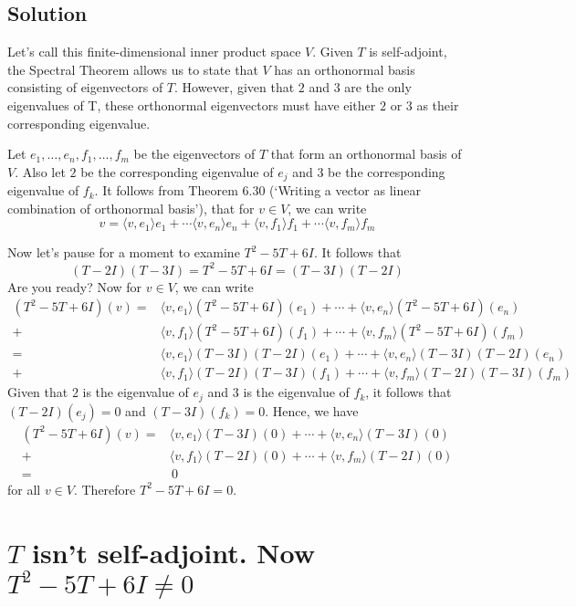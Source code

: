 \documentclass{article}
\begin{document}
\subsection*{Solution}
Let's call this finite-dimensional inner product space $V$. Given $T$ is self-adjoint, the Spectral Theorem allows us to state that $V$ has an orthonormal basis consisting of eigenvectors of $T$. However, given that $2$ and $3$ are the only eigenvalues of T, these orthonormal eigenvectors must have either $2$ or $3$ as their corresponding eigenvalue.

Let $e_1,\ldots,e_n,f_1,\ldots,f_m$ be the eigenvectors of $T$ that form an orthonormal basis of $V$. Also let $2$ be the corresponding eigenvalue of $e_j$ and $3$ be the corresponding eigenvalue of $f_k$. It follows from Theorem 6.30 (`Writing a vector as linear combination of orthonormal basis'), that for $v\in V$, we can write
\[v=\langle v,e_1\rangle e_1 + \cdots \langle v,e_n\rangle e_n + \langle v,f_1\rangle f_1 + \cdots \langle v,f_m\rangle f_m \]

Now let's pause for a moment to examine $T^2-5T+6I$. It follows that 
\[(T-2I)(T-3I)=T^2-5T+6I=(T-3I)(T-2I)\]
Are you ready? Now for $v\in V$, we can write
\begin{align*}
    (T^2-5T+6I)(v) = &\langle v,e_1\rangle(T^2-5T+6I) (e_1) + \cdots + \langle v,e_n\rangle (T^2-5T+6I)(e_n)\\
    + &\langle v,f_1\rangle(T^2-5T+6I) (f_1) + \cdots + \langle v,f_m\rangle(T^2-5T+6I) (f_m) \\
    = &\langle v,e_1\rangle(T-3I)(T-2I)(e_1) + \cdots + \langle v,e_n\rangle (T-3I)(T-2I)(e_n)\\
    + &\langle v,f_1\rangle(T-2I)(T-3I)(f_1) + \cdots + \langle v,f_m\rangle(T-2I)(T-3I)(f_m)
\end{align*}
Given that $2$ is the eigenvalue of $e_j$ and $3$ is the eigenvalue of $f_k$, it follows that $(T-2I)(e_j)=0$ and $(T-3I)(f_k)=0$. Hence, we have
\begin{align*}
    (T^2-5T+6I)(v) = &\langle v,e_1\rangle(T-3I)(0) + \cdots + \langle v,e_n\rangle (T-3I)(0)\\
    + &\langle v,f_1\rangle(T-2I)(0) + \cdots + \langle v,f_m\rangle(T-2I)(0) \\
    = &\, 0
\end{align*}
for all $v\in V$. Therefore $T^2-5T+6I=0$.

\clearpage

\section{$T$ isn't self-adjoint. Now $T^2-5T+6I\neq 0$}
\end{document}

